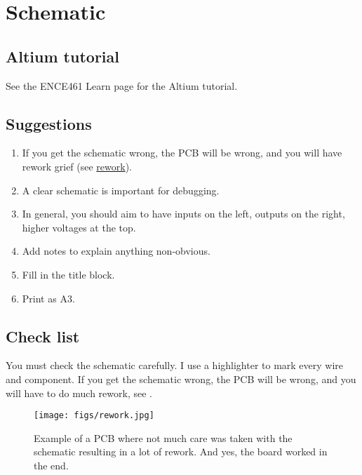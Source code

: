 \chapter{Schematic}


\section{Altium tutorial}


See the ENCE461 Learn page for the Altium tutorial.


\section{Suggestions}

\begin{enumerate}
\item If you get the schematic wrong, the PCB will be wrong, and you
  will have rework grief (see \hyperref[rework]{rework}).

\item A clear schematic is important for debugging.

\item In general, you should aim to have inputs on the left, outputs
  on the right, higher voltages at the top.

\item Add notes to explain anything non-obvious.

\item Fill in the title block.

\item Print as A3.
\end{enumerate}



\section{Check list}
\label{schematic-check-list}

You must check the schematic carefully.  I use a highlighter to mark
every wire and component.  If you get the schematic wrong, the PCB
will be wrong, and you will have to do much rework, see
.


\begin{figure}[!h]
  \centering
  \texttt{[image: figs/rework.jpg]}
  \caption{Example of a PCB where not much care was taken with the
    schematic resulting in a lot of rework.  And yes, the board worked
    in the end.}
  \label{fig:rework}
\end{figure}



